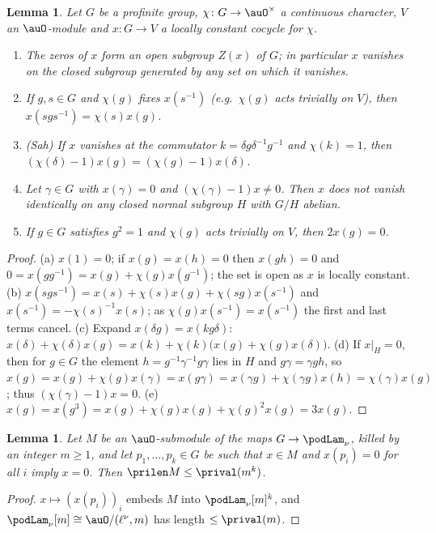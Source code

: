 \documentclass[10pt]{amsart}
\newtheorem{lemma}[theorem]{Lemma}
\theoremstyle{definition}
\theoremstyle{remark}
\begin{document}
\begin{lemma}\label{pod:coc}
Let $G$ be a profinite group, $\chi\colon G\to\auO^\times$ a continuous character, $V$ an
$\auO$-module and $x\colon G\to V$ a locally constant cocycle for $\chi$.
\begin{enumerate}
\item[(a)] The zeros of $x$ form an open subgroup $Z(x)$ of $G$; in particular $x$ vanishes on the
closed subgroup generated by any set on which it vanishes.
\item[(b)] If $g,s\in G$ and $\chi(g)$ fixes $x(s^{-1})$ \textup(e.g.\ $\chi(g)$ acts trivially on
$V$\textup), then $x(sgs^{-1})=\chi(s)x(g)$.
\item[(c)] \textup(Sah\textup) If $x$ vanishes at the commutator $k=\delta g\delta^{-1}g^{-1}$ and
$\chi(k)=1$, then $(\chi(\delta)-1)x(g)=(\chi(g)-1)x(\delta)$.
\item[(d)] Let $\gamma\in G$ with $x(\gamma)=0$ and $(\chi(\gamma)-1)x\ne0$. Then $x$ does not vanish
identically on any closed normal subgroup $H$ with $G/H$ abelian.
\item[(e)] If $g\in G$ satisfies $g^2=1$ and $\chi(g)$ acts trivially on $V$, then $2x(g)=0$.
\end{enumerate}
\end{lemma}
\begin{proof}
(a) $x(1)=0$; if $x(g)=x(h)=0$ then $x(gh)=0$ and $0=x(gg^{-1})=x(g)+\chi(g)x(g^{-1})$; the set is
open as $x$ is locally constant. (b) $x(sgs^{-1})=x(s)+\chi(s)x(g)+\chi(sg)x(s^{-1})$ and $x(s^{-1})
=-\chi(s)^{-1}x(s)$; as $\chi(g)x(s^{-1})=x(s^{-1})$ the first and last terms cancel. (c) Expand
$x(\delta g)=x(kg\delta)$: $x(\delta)+\chi(\delta)x(g)=x(k)+\chi(k)\bigl(x(g)+\chi(g)x(\delta)\bigr)$.
(d) If $x|_H=0$, then for $g\in G$ the element $h=g^{-1}\gamma^{-1}g\gamma$ lies in $H$ and
$g\gamma=\gamma gh$, so $x(g)=x(g)+\chi(g)x(\gamma)=x(g\gamma)=x(\gamma g)+\chi(\gamma g)x(h)=
\chi(\gamma)x(g)$; thus $(\chi(\gamma)-1)x=0$. (e) $x(g)=x(g^3)=x(g)+\chi(g)x(g)+\chi(g)^2x(g)=3x(g)$.
\end{proof}

\begin{lemma}\label{pod:length}
Let $M$ be an $\auO$-submodule of the maps $G\to\podLam_\nu$, killed by an integer $m\ge1$, and let
$p_1,\dots,p_k\in G$ be such that $x\in M$ and $x(p_i)=0$ for all $i$ imply $x=0$. Then
$\prilen M\le\prival(m^k)$.
\end{lemma}
\begin{proof}
$x\mapsto(x(p_i))_i$ embeds $M$ into $\podLam_\nu[m]^k$, and $\podLam_\nu[m]\cong\auO/(\ell^\nu,m)$
has length $\le\prival(m)$.
\end{proof}
\end{document}
